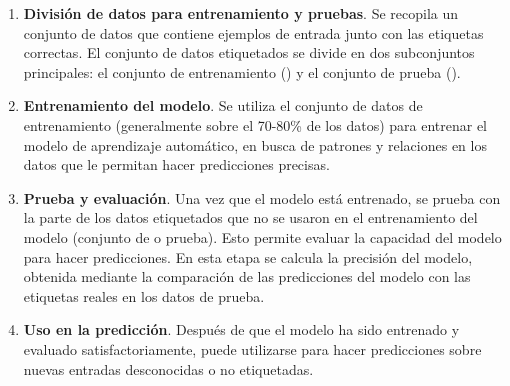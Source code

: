 \begin{enumerate}
	\item \textbf{División de datos para entrenamiento y pruebas}. Se recopila un conjunto de datos que contiene ejemplos de entrada 
	junto con las etiquetas correctas. El conjunto de datos etiquetados se divide en dos subconjuntos principales: 
	el conjunto de entrenamiento () y el conjunto de prueba (). 
    \item \textbf{Entrenamiento del modelo}. Se utiliza el conjunto de datos de entrenamiento (generalmente sobre
	 el 70-80\% de los datos) para entrenar el modelo de aprendizaje automático, en busca de patrones y relaciones en los datos
	  que le permitan hacer predicciones precisas.
	\item \textbf{Prueba y evaluación}. Una vez que el modelo está entrenado, se prueba con la parte de los datos etiquetados 
	que no se usaron en el entrenamiento del modelo (conjunto de  o prueba). Esto permite evaluar la capacidad del 
	modelo para hacer predicciones. En esta etapa se calcula la precisión del modelo, obtenida mediante la comparación de
	 las predicciones del modelo con las etiquetas reales en los datos de prueba.
	\item \textbf{Uso en la predicción}. Después de que el modelo ha sido entrenado y evaluado satisfactoriamente, 
	puede utilizarse para hacer predicciones sobre nuevas entradas desconocidas o no etiquetadas. 
\end{enumerate}

